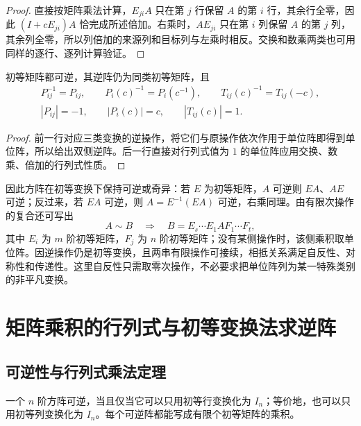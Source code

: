 \begin{proof}
直接按矩阵乘法计算，$E_{ji}A$ 只在第 $j$ 行保留 $A$ 的第 $i$ 行，其余行全零，因此 $(I+cE_{ji})A$ 恰完成所述倍加。右乘时，$AE_{ji}$ 只在第 $i$ 列保留 $A$ 的第 $j$ 列，其余列全零，所以列倍加的来源列和目标列与左乘时相反。交换和数乘两类也可用同样的逐行、逐列计算验证。
\end{proof}

\begin{corollary}
\label{cor:matrix-elementary-inverse-determinant}
初等矩阵都可逆，其逆阵仍为同类初等矩阵，且
\[
    \begin{gathered}
        P_{ij}^{-1}=P_{ij},\qquad
        P_i(c)^{-1}=P_i(c^{-1}),\qquad
        T_{ij}(c)^{-1}=T_{ij}(-c),\\
        |P_{ij}|=-1,\qquad |P_i(c)|=c,\qquad |T_{ij}(c)|=1.
    \end{gathered}
\]
\end{corollary}

\begin{proof}
前一行对应三类变换的逆操作，将它们与原操作依次作用于单位阵即得到单位阵，所以给出双侧逆阵。后一行直接对行列式值为 $1$ 的单位阵应用交换、数乘、倍加的行列式性质。
\end{proof}

因此方阵在初等变换下保持可逆或奇异：若 $E$ 为初等矩阵，$A$ 可逆则 $EA$、$AE$ 可逆；反过来，若 $EA$ 可逆，则 $A=E^{-1}(EA)$ 可逆，右乘同理。由有限次操作的复合还可写出
\begin{equation}
\label{eq:matrix-equivalence-products}
    A\sim B\quad\Longrightarrow\quad
    B=E_s\cdots E_1AF_1\cdots F_t,
\end{equation}
其中 $E_i$ 为 $m$ 阶初等矩阵，$F_j$ 为 $n$ 阶初等矩阵；没有某侧操作时，该侧乘积取单位阵。因逆操作仍是初等变换，且两串有限操作可接续，相抵关系满足自反性、对称性和传递性。这里自反性只需取零次操作，不必要求把单位阵列为某一特殊类别的非平凡变换。

\section{矩阵乘积的行列式与初等变换法求逆阵}
\label{sec:matrix-determinant-inversion}

\subsection{可逆性与行列式乘法定理}

\begin{lemma}
\label{lem:matrix-invertible-row-reduction}
一个 $n$ 阶方阵可逆，当且仅当它可以只用初等行变换化为 $I_n$；等价地，也可以只用初等列变换化为 $I_n$。每个可逆阵都能写成有限个初等矩阵的乘积。
\end{lemma}

